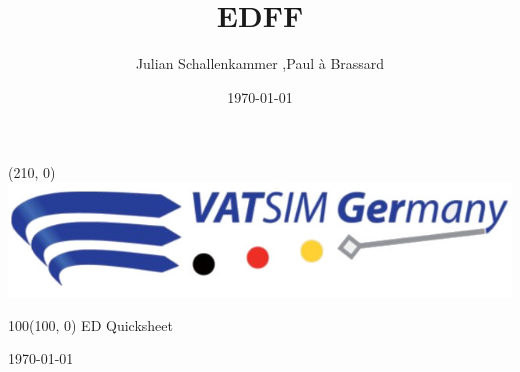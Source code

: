 \documentclass[10pt,landscape,a4paper]{article}
\title{EDFF}
\author{Julian Schallenkammer ,Paul à Brassard}
\date{\today}
\begin{document}
\setlength\extrarowheight{1pt}

\setlength{\TPHorizModule}{1mm}
\setlength{\TPVertModule}{\TPHorizModule}
\textblockorigin{7mm}{12mm}

\begin{textblock}{2}(210, 0)
  \includegraphics[width=30\textwidth]{VATGer-Logo-Colour}
\end{textblock}


\begin{textblock}{100}(100, 0)
  \large
  \centering
  ED Quicksheet

  \today
\end{textblock}
\end{document}
